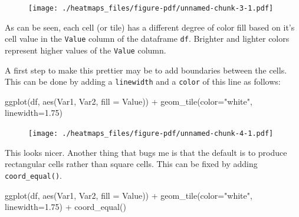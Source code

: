 \documentclass[
  letterpaper,
  DIV=11,
  numbers=noendperiod]{scrreprt}
\newenvironment{Shaded}{\begin{snugshade}}{\end{snugshade}}
\newcommand{\AttributeTok}[1]{\textcolor[rgb]{0.40,0.45,0.13}{#1}}
\newcommand{\FloatTok}[1]{\textcolor[rgb]{0.68,0.00,0.00}{#1}}
\newcommand{\FunctionTok}[1]{\textcolor[rgb]{0.28,0.35,0.67}{#1}}
\newcommand{\NormalTok}[1]{\textcolor[rgb]{0.00,0.23,0.31}{#1}}
\newcommand{\SpecialCharTok}[1]{\textcolor[rgb]{0.37,0.37,0.37}{#1}}
\newcommand{\StringTok}[1]{\textcolor[rgb]{0.13,0.47,0.30}{#1}}
\begin{document}
\begin{figure}[H]

{\centering \texttt{[image: ./heatmaps\_files/figure-pdf/unnamed-chunk-3-1.pdf]}

}

\end{figure}

As can be seen, each cell (or tile) has a different degree of color fill
based on it's cell value in the \texttt{Value} column of the dataframe
\texttt{df}. Brighter and lighter colors represent higher values of the
\texttt{Value} column.

A first step to make this prettier may be to add boundaries between the
cells. This can be done by adding a \texttt{linewidth} and a
\texttt{color} of this line as follows:

\begin{Shaded}
\begin{Highlighting}[]
\FunctionTok{ggplot}\NormalTok{(df, }\FunctionTok{aes}\NormalTok{(Var1, Var2, }\AttributeTok{fill =}\NormalTok{ Value)) }\SpecialCharTok{+} 
  \FunctionTok{geom\_tile}\NormalTok{(}\AttributeTok{color=}\StringTok{"white"}\NormalTok{, }\AttributeTok{linewidth=}\FloatTok{1.75}\NormalTok{)}
\end{Highlighting}
\end{Shaded}

\begin{figure}[H]

{\centering \texttt{[image: ./heatmaps\_files/figure-pdf/unnamed-chunk-4-1.pdf]}

}

\end{figure}

This looks nicer. Another thing that bugs me is that the default is to
produce rectangular cells rather than square cells. This can be fixed by
adding \texttt{coord\_equal()}.

\begin{Shaded}
\begin{Highlighting}[]
\FunctionTok{ggplot}\NormalTok{(df, }\FunctionTok{aes}\NormalTok{(Var1, Var2, }\AttributeTok{fill =}\NormalTok{ Value)) }\SpecialCharTok{+} 
  \FunctionTok{geom\_tile}\NormalTok{(}\AttributeTok{color=}\StringTok{"white"}\NormalTok{, }\AttributeTok{linewidth=}\FloatTok{1.75}\NormalTok{) }\SpecialCharTok{+}
  \FunctionTok{coord\_equal}\NormalTok{()}
\end{Highlighting}
\end{Shaded}
\end{document}
